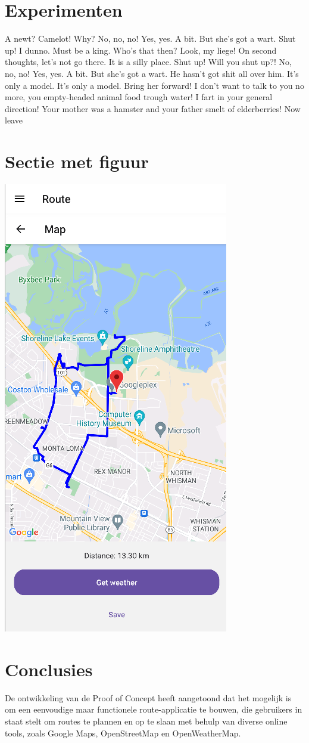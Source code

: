 \documentclass[a0,portrait]{hogent-poster}
\begin{document}
\begin{multicols}{2}
\section{Experimenten}

A newt? Camelot! Why? No, no, no! Yes, yes. A bit. But she's got a wart.
Shut up! I dunno. Must be a king. Who's that then? Look, my liege! On second thoughts, let's not go there. It is a silly place.
Shut up! Will you shut up?! No, no, no! Yes, yes. A bit. But she's got a wart. He hasn't got shit all over him. It's only a model. It's only a model.
Bring her forward! I don't want to talk to you no more, you empty-headed animal food trough water! I fart in your general direction! Your mother was a hamster and your father smelt of elderberries! Now leave 

\section{Sectie met figuur}


\begin{center}
  \captionsetup{type=figure}
  \includegraphics[height=0.5\linewidth]{graphics/10km_route.png}
\end{center}


\section{Conclusies}

De ontwikkeling van de Proof of Concept heeft aangetoond dat het mogelijk is om een eenvoudige maar functionele route-applicatie te bouwen, die gebruikers in staat stelt om routes te plannen en op te slaan met behulp van diverse online tools, zoals Google Maps, OpenStreetMap en OpenWeatherMap.


\end{multicols}
\end{document}
